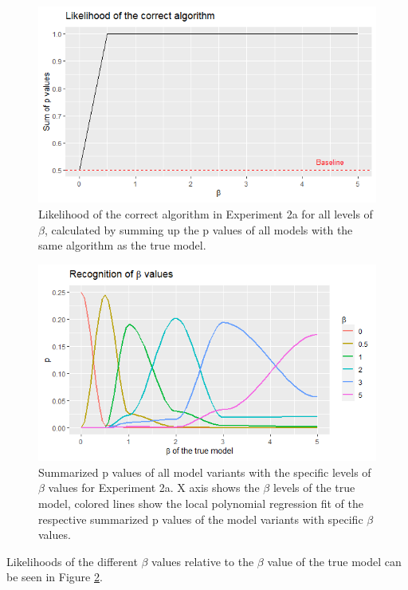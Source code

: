 \begin{figure}
	\centering
	\includegraphics[width=0.95\linewidth]{../../statistics/R_convex_beta_algosum}
	\caption{Likelihood of the correct algorithm in Experiment 2a for all levels of $\beta$, calculated by summing up the p values of all models with the same algorithm as the true model.}
	\label{fig:rconvexbetaalgosum}
\end{figure}

\begin{figure}
	\centering
	\includegraphics[width=0.95\linewidth]{../../statistics/R_beta}
	\caption{Summarized p values of all model variants with the specific levels of $\beta$ values for Experiment 2a. X axis shows the $\beta$ levels of the true model, colored lines show the local polynomial regression fit of the respective summarized p values of the model variants with specific $\beta$ values.}
	\label{fig:rbetaconvex}
\end{figure}

Likelihoods of the different $\beta$ values relative to the $\beta$ value of the true model can be seen in Figure \ref{fig:rbetaconvex}.

